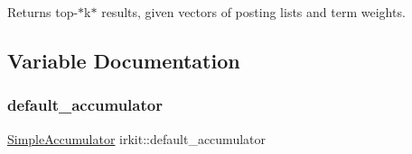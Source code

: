Returns top-\/$\ast$k$\ast$ results, given vectors of posting lists and term weights. 



\subsection{Variable Documentation}
\mbox{\label{namespaceirkit_a823671564bf545991e9708011e4a8df1}} 
\subsubsection{\texorpdfstring{default\+\_\+accumulator}{default\_accumulator}}
{\footnotesize\ttfamily \hyperlink{classirkit_1_1SimpleAccumulator}{Simple\+Accumulator} irkit\+::default\+\_\+accumulator}

